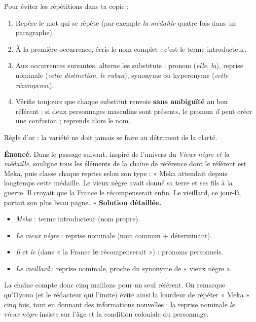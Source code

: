 \documentclass[11pt]{article}
\newcommand{\cle}[1]{{\popxbold\color{popdark}#1}}
\begin{document}
\begin{methode}
Pour éviter les répétitions dans ta copie :
\begin{enumerate}
\item Repère le mot qui se répète (par exemple \emph{la médaille} quatre fois dans un paragraphe).
\item À la première occurrence, écris le nom complet : c'est le terme introducteur.
\item Aux occurrences suivantes, alterne les substituts : pronom (\emph{elle}, \emph{la}), reprise nominale (\emph{cette distinction}, \emph{le ruban}), synonyme ou hyperonyme (\emph{cette récompense}).
\item Vérifie toujours que chaque substitut renvoie \textbf{sans ambiguïté} au bon référent : si deux personnages masculins sont présents, le pronom \emph{il} peut créer une confusion ; reprends alors le nom.
\end{enumerate}
Règle d'or : la variété ne doit jamais se faire au détriment de la \cle{clarté}.
\end{methode}

\begin{exoresolu}
\textbf{Énoncé.} Dans le passage suivant, inspiré de l'univers du \emph{Vieux nègre et la médaille}, souligne tous les éléments de la chaîne de référence dont le référent est Meka, puis classe chaque reprise selon son type : « Meka attendait depuis longtemps cette médaille. Le vieux nègre avait donné sa terre et ses fils à la guerre. Il croyait que la France le récompenserait enfin. Le vieillard, ce jour-là, portait son plus beau pagne. »
\tcblower
\textbf{Solution détaillée.}
\begin{itemize}
\item \emph{Meka} : terme introducteur (nom propre).
\item \emph{Le vieux nègre} : reprise nominale (nom commun + déterminant).
\item \emph{Il} et \emph{le} (dans « la France \textbf{le} récompenserait ») : pronoms personnels.
\item \emph{Le vieillard} : reprise nominale, proche du synonyme de « vieux nègre ».
\end{itemize}
La chaîne compte donc cinq maillons pour un seul référent. On remarque qu'Oyono (et le rédacteur qui l'imite) évite ainsi la lourdeur de répéter « Meka » cinq fois, tout en donnant des informations nouvelles : la reprise nominale \emph{le vieux nègre} insiste sur l'âge et la condition coloniale du personnage.
\end{exoresolu}
\end{document}
